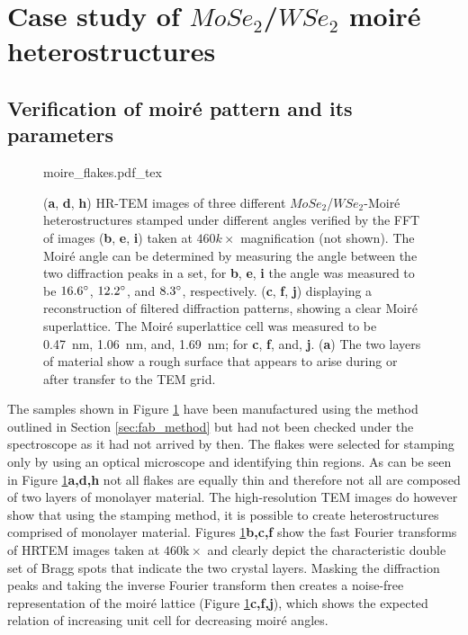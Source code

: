 \section{Case study of $MoSe_2$/$WSe_2$ moiré heterostructures}

\subsection{Verification of moiré pattern and its parameters}

\begin{figure}[p]
    \centering
    \def\svgwidth{.9\linewidth}
    {moire_flakes.pdf_tex}
    \caption{(\textbf{a}, \textbf{d}, \textbf{h}) HR-TEM images of three different $MoSe_2$/$WSe_2$-Moiré heterostructures stamped under different angles verified by the FFT of images (\textbf{b}, \textbf{e}, \textbf{i}) taken at $460k\times$ magnification (not shown). The Moiré angle can be determined by measuring the angle between the two diffraction peaks in a set, for \textbf{b}, \textbf{e}, \textbf{i} the angle was measured to be $16.6\degree$, $12.2\degree$, and $8.3\degree$, respectively. (\textbf{c}, \textbf{f}, \textbf{j}) displaying a reconstruction of filtered diffraction patterns, showing a clear Moiré superlattice. The Moiré superlattice cell was measured to be \SI{0.47}{nm}, \SI{1.06}{nm}, and, \SI{1.69}{nm}; for \textbf{c}, \textbf{f}, and, \textbf{j}. (\textbf{a}) The two layers of material show a rough surface that appears to arise during or after transfer to the TEM grid.}
    \label{fig:moire_overview}
\end{figure}

The samples shown in Figure \ref{fig:moire_overview} have been manufactured using the method outlined in Section \ref{sec:fab_method} but had not been checked under the spectroscope as it had not arrived by then. The flakes were selected for stamping only by using an optical microscope and identifying thin regions. As can be seen in Figure \ref{fig:moire_overview}\textbf{a,d,h} not all flakes are equally thin and therefore not all are composed of two layers of monolayer material. The high-resolution TEM images do however show that using the stamping method, it is possible to create heterostructures comprised of monolayer material. Figures \ref{fig:moire_overview}\textbf{b,c,f} show the fast Fourier transforms of HRTEM images taken at $460\mathrm{k}\times$ and clearly depict the characteristic double set of Bragg spots that indicate the two crystal layers. Masking the diffraction peaks and taking the inverse Fourier transform then creates a noise-free representation of the moiré lattice (Figure \ref{fig:moire_overview}\textbf{c,f,j}), which shows the expected relation of increasing unit cell for decreasing moiré angles.


